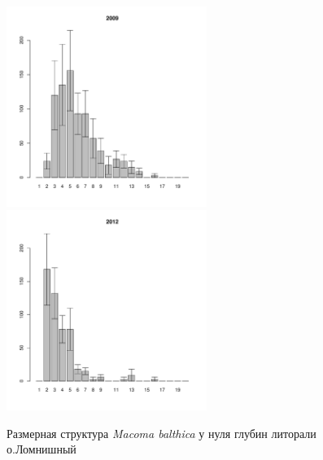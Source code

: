 \begin{figure}[h]

\begin{multicols}{2}
\hfill
\includegraphics[width=65mm]{../White_Sea/Lomnishniy/Lomnishniy_2009_.pdf}
\hfill
\includegraphics[width=65mm]{../White_Sea/Lomnishniy/Lomnishniy_2012_.pdf}
\end{multicols}



\caption{Размерная структура {\it Macoma balthica} у нуля глубин литорали о.Ломнишный}
\label{ris:size_str_Lomnishniy}
\end{figure}

